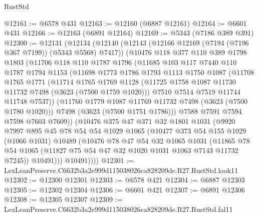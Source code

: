 \begin{lexlean}{RustStd}
\begin{coremodule}
@12161 := @6578 @431
@12163 := @12160 (@6887 @12161)
@12164 := @6601 @431
@12166 := @12163 (@6891 @12164)
@12169 := @5343 (@7186 @389 @391)
@12300 := @12131
    (@12134
      (@12140
        (@12143 (@12166 @12169 (@7194 (@7196 @367 @7199)) (@5343 @5568) @7417))
        (@10476
          @118
          @377
          @110
          @389
          @1798
          @1803
          (@11706
            @118
            @110
            @1787
            @1796
            (@11685
              @103
              @117
              @7440
              @110
              @1787
              @1794
              @1153
              (@11698
                @1773
                @1786
                @1793
                @1113
                @1750
                @1087
                (@11708
                  @1765
                  @1771
                  (@11714
                    @1765
                    @1769
                    @1128
                    (@11725 @1758 @1087 @11730 @11732 @7498 (@3623 (@7500 @1759 @1020)))
                    @7510
                    @7514
                    @7519
                    @11744
                    @11748
                    @7537))
                (@11760 @1779 @1087 @11769 @11732 @7498 (@3623 (@7500 @1780 @1020)))
                @7498
                (@3623 (@7500 @1751 @1786)))
              @7588
              @7591
              @7594
              @7598
              @7603
              @7609))
          (@10476
            @375
            @47
            @371
            @32
            @1801
            @1031
            (@9920
              @7997
              @895
              @45
              @78
              @54
              @54
              @1029
              @1065
              (@10477
                @373
                @54
                @155
                @1029
                (@1066 @1031)
                @10489
                (@10476
                  @78
                  @47
                  @54
                  @32
                  @1065
                  @1031
                  (@11865
                    @78
                    @54
                    @1065
                    (@11827 @75 @54 @47 @32 @1020 @1031 @1063 @7143 @11732 @7245))
                  @10491)))
            @10491))))
@12301 := LexLeanPreserve.C6632b3a2e999d115038026ca828209de.R27.RustStd.look11
@12302 := @12300 @12301
@12303 := @6578 @421
@12304 := @6887 @12303
@12305 := @12302 @12304
@12306 := @6601 @421
@12307 := @6891 @12306
@12308 := @12305 @12307
@12309 := LexLeanPreserve.C6632b3a2e999d115038026ca828209de.R27.RustStd.fal11

\end{coremodule}
\end{lexlean}
